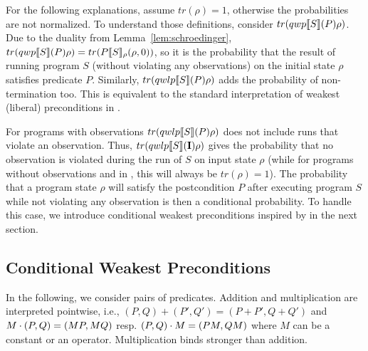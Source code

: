 \documentclass[a4paper,UKenglish,cleveref, autoref, thm-restate]{lipics-v2021}
\begin{document}
For the following explanations, assume $tr(\rho)=1$, otherwise the probabilities are not normalized. To understand those definitions, consider $tr(qwp\llbracket S \rrbracket (P) \rho)$.  Due to the duality from Lemma~\ref{lem:schroedinger}, $tr(qwp\llbracket S \rrbracket (P)\rho) = tr(P\llbracket S \rrbracket_{\rho}(\rho,0))$, so it is the probability that the result of running program $S$ (without violating any observations) on the initial state $\rho$ satisfies predicate $P$. Similarly, $tr(qwlp\llbracket S \rrbracket (P)\rho)$ adds the probability of non-termination too. This is equivalent to the standard interpretation of weakest (liberal) preconditions in \cite{floydHoareLogic}.

For programs with observations $tr(qwlp\llbracket S \rrbracket (P)\rho)$ does not include runs that violate an observation. Thus, $tr(qwlp\llbracket S \rrbracket (\textbf{I}) \rho)$ gives the probability that no observation is violated during the run of $S$ on input state $\rho$ (while for programs without observations and in \cite{floydHoareLogic}, this will always be $tr(\rho)=1$). The probability that a program state $\rho$ will satisfy the postcondition $P$ after executing program $S$ while not violating any observation is then a conditional probability. To handle this case, we introduce conditional weakest preconditions inspired by \cite{conditioningProb} in the next section.

\subsection{Conditional Weakest Preconditions}
In the following, we consider pairs of predicates. Addition and multiplication are interpreted pointwise, i.e., $(P,Q) + (P',Q') = (P+P',Q+Q')$ and $M \cdot (P,Q) = (MP,MQ)$ resp. $(P,Q) \cdot M = (PM,QM)$ where $M$ can be a constant or an operator. Multiplication binds stronger than addition.
\end{document}
